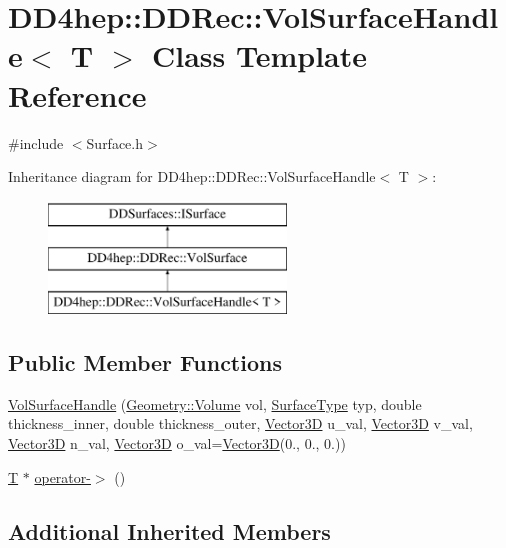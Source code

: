 \hypertarget{class_d_d4hep_1_1_d_d_rec_1_1_vol_surface_handle}{}\section{D\+D4hep\+:\+:D\+D\+Rec\+:\+:Vol\+Surface\+Handle$<$ T $>$ Class Template Reference}
\label{class_d_d4hep_1_1_d_d_rec_1_1_vol_surface_handle}


{\ttfamily \#include $<$Surface.\+h$>$}

Inheritance diagram for D\+D4hep\+:\+:D\+D\+Rec\+:\+:Vol\+Surface\+Handle$<$ T $>$\+:\begin{figure}[H]
\begin{center}
\leavevmode
\includegraphics[height=3.000000cm]{class_d_d4hep_1_1_d_d_rec_1_1_vol_surface_handle}
\end{center}
\end{figure}
\subsection*{Public Member Functions}
\begin{DoxyCompactItemize}
\item 
\hyperlink{class_d_d4hep_1_1_d_d_rec_1_1_vol_surface_handle_a94c84574cd5621be9f053d0734f80e46}{Vol\+Surface\+Handle} (\hyperlink{class_d_d4hep_1_1_geometry_1_1_volume}{Geometry\+::\+Volume} vol, \hyperlink{class_d_d_surfaces_1_1_surface_type}{Surface\+Type} typ, double thickness\+\_\+inner, double thickness\+\_\+outer, \hyperlink{class_d_d_surfaces_1_1_vector3_d}{Vector3D} u\+\_\+val, \hyperlink{class_d_d_surfaces_1_1_vector3_d}{Vector3D} v\+\_\+val, \hyperlink{class_d_d_surfaces_1_1_vector3_d}{Vector3D} n\+\_\+val, \hyperlink{class_d_d_surfaces_1_1_vector3_d}{Vector3D} o\+\_\+val=\hyperlink{class_d_d_surfaces_1_1_vector3_d}{Vector3D}(0., 0., 0.))
\item 
\hyperlink{class_t}{T} $\ast$ \hyperlink{class_d_d4hep_1_1_d_d_rec_1_1_vol_surface_handle_a4151ddc65e68b405fb406ebb6b6622a1}{operator-\/$>$} ()
\end{DoxyCompactItemize}
\subsection*{Additional Inherited Members}


